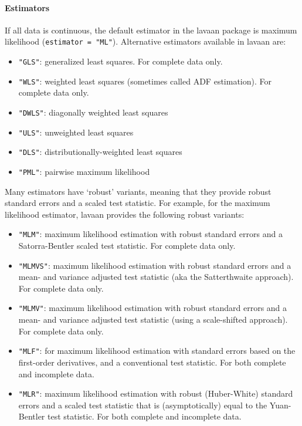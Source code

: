 \hypertarget{estimators}{%
\paragraph{Estimators}\label{estimators}}

If all data is continuous, the default estimator in the lavaan package
is maximum likelihood (\texttt{estimator\ =\ "ML"}). Alternative
estimators available in lavaan are:

\begin{itemize}
\tightlist
\item
  \texttt{"GLS"}: generalized least squares. For complete data only.
\item
  \texttt{"WLS"}: weighted least squares (sometimes called ADF
  estimation). For complete data only.
\item
  \texttt{"DWLS"}: diagonally weighted least squares
\item
  \texttt{"ULS"}: unweighted least squares
\item
  \texttt{"DLS"}: distributionally-weighted least squares
\item
  \texttt{"PML"}: pairwise maximum likelihood
\end{itemize}

Many estimators have `robust' variants, meaning that they provide robust
standard errors and a scaled test statistic. For example, for the
maximum likelihood estimator, lavaan provides the following robust
variants:

\begin{itemize}
\tightlist
\item
  \texttt{"MLM"}: maximum likelihood estimation with robust standard
  errors and a Satorra-Bentler scaled test statistic. For complete data
  only.
\item
  \texttt{"MLMVS"}: maximum likelihood estimation with robust standard
  errors and a mean- and variance adjusted test statistic (aka the
  Satterthwaite approach). For complete data only.
\item
  \texttt{"MLMV"}: maximum likelihood estimation with robust standard
  errors and a mean- and variance adjusted test statistic (using a
  scale-shifted approach). For complete data only.
\item
  \texttt{"MLF"}: for maximum likelihood estimation with standard errors
  based on the first-order derivatives, and a conventional test
  statistic. For both complete and incomplete data.
\item
  \texttt{"MLR"}: maximum likelihood estimation with robust
  (Huber-White) standard errors and a scaled test statistic that is
  (asymptotically) equal to the Yuan-Bentler test statistic. For both
  complete and incomplete data.
\end{itemize}

